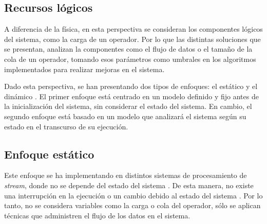 \subsection{Recursos lógicos}
\label{subsec:recLogicosBC}

A diferencia de la física, en esta perspectiva se consideran los componentes lógicos del sistema, como la carga de un operador. Por lo que las distintas soluciones que se presentan, analizan la componentes como el flujo de datos o el tamaño de la cola de un operador, tomando esos parámetros como umbrales en los algoritmos implementados para realizar mejoras en el sistema.


Dado esta perspectiva, se han presentando dos tipos de enfoques: el estático y el dinámico \citep{Gupta99loadsharing}. El primer enfoque está centrado en un modelo definido y fijo antes de la inicialización del sistema, sin considerar el estado del sistema. En cambio, el segundo enfoque está basado en un modelo que analizará el sistema según su estado en el transcurso de su ejecución.


\subsection{Enfoque estático}
\label{subsec:enfoqueEstaticoBC}
Este enfoque se ha implementando en distintos sistemas de procesamiento de \textsl{stream}, donde no se depende del estado del sistema \citep{stormtwitter, s4}. De esta manera, no existe una interrupción en la ejecución o un cambio debido al estado del sistema \citep{CasavantK88}. Por lo tanto, no se considera variables como la carga o cola del operador, sólo se aplican técnicas que administren el flujo de los datos en el sistema.


